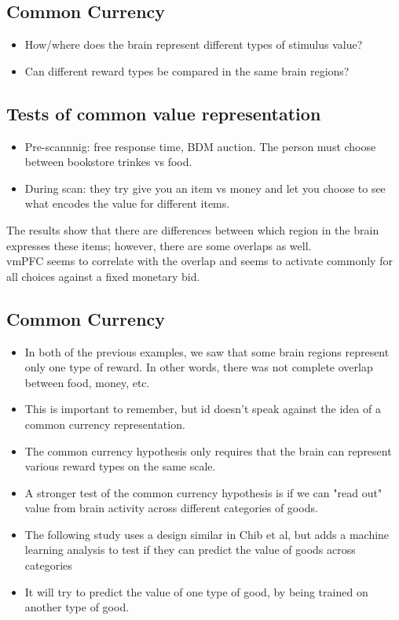 \subsection{Common Currency}
\begin{itemize}
    \item How/where does the brain represent different types of stimulus value?
    \item Can different reward types be compared in the same brain regions?
\end{itemize}
\subsection{Tests of common value representation}
\begin{itemize}
    \item Pre-scannnig: free response time, BDM auction. The person must choose between bookstore trinkes vs food.
    \item During scan: they try give you an item vs money and let you choose to see what encodes the value for different items.
\end{itemize}
The results show that there are differences between which region in the brain expresses these items; however, there are some overlaps as well.
\\vmPFC seems to correlate with the overlap and seems to activate commonly for all choices against a fixed monetary bid.

\subsection{Common Currency}
\begin{itemize}
    \item In both of the previous examples, we saw that some brain regions represent only one type of reward. In other words, there was not complete overlap between food, money, etc.
    \item This is important to remember, but id doesn't speak against the idea of a common currency representation.
    \item The common currency hypothesis only requires that the brain can represent various reward types on the same scale.
    \item A stronger test of the common currency hypothesis is if we can "read out" value from brain activity across different categories of goods.
    \item The following study uses a design similar in Chib et al, but adds a machine learning analysis to test if they can predict the value of goods across categories
    \item It will try to predict the value of one type of good, by being trained on another type of good.
    \end{itemize}

